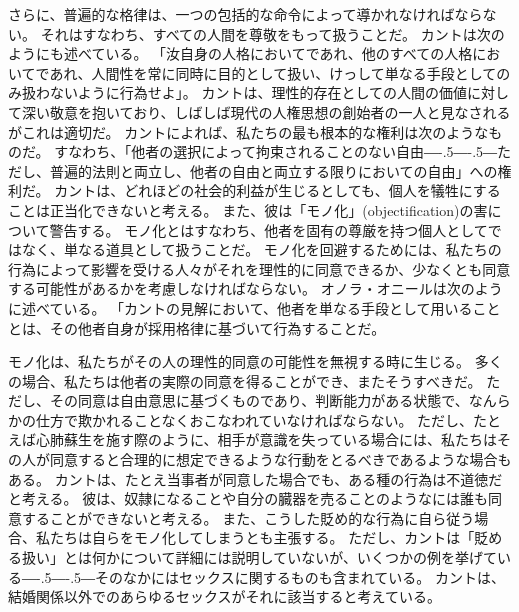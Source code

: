 \documentclass[paper=a4,book,openany]{jlreq}
\def\DDASH{―\kern-.5\zw―\kern-.5\zw―} %
\begin{document}
さらに、普遍的な格律は、一つの包括的な命令によって導かれなければならない。
それはすなわち、すべての人間を尊敬をもって扱うことだ。
カントは次のようにも述べている。
「汝自身の人格においてであれ、他のすべての人格においてであれ、人間性を常に同時に目的として扱い、けっして単なる手段としてのみ扱わないように行為せよ」\citep[4:429, p.41]{kant11:_groun_metap_moral}。
カントは、理性的存在としての人間の価値に対して深い敬意を抱いており、しばしば現代の人権思想の創始者の一人と見なされるがこれは適切だ。
カントによれば、私たちの最も根本的な権利は次のようなものだ。
すなわち、「他者の選択によって拘束されることのない自由{\DDASH}ただし、普遍的法則と両立し、他者の自由と両立する限りにおいての自由」\citep[6:237]{kant96:_metap_moral}への権利だ。
カントは、どれほどの社会的利益が生じるとしても、個人を犠牲にすることは正当化できないと考える。
また、彼は「モノ化」(objectification)の害について警告する。
モノ化とはすなわち、他者を固有の尊厳を持つ個人としてではなく、単なる道具として扱うことだ。
モノ化を回避するためには、私たちの行為によって影響を受ける人々がそれを理性的に同意できるか、少なくとも同意する可能性があるかを考慮しなければならない。
オノラ・オニールは次のように述べている。
「カントの見解において、他者を単なる手段として用いることとは、その他者自身が採用格律に基づいて行為することだ\citep[p.138]{oneill89:_const_reason}。

モノ化は、私たちがその人の理性的同意の可能性を無視する時に生じる。
多くの場合、私たちは他者の実際の同意を得ることができ、またそうすべきだ。
ただし、その同意は自由意思に基づくものであり、判断能力がある状態で、なんらかの仕方で欺かれることなくおこなわれていなければならない。
ただし、たとえば心肺蘇生を施す際のように、相手が意識を失っている場合には、私たちはその人が同意すると合理的に想定できるような行動をとるべきであるような場合もある。
カントは、たとえ当事者が同意した場合でも、ある種の行為は不道徳だと考える。
彼は、奴隷になることや自分の臓器を売ることのようなには誰も同意することができないと考える。
また、こうした貶め的な行為に自ら従う場合、私たちは自らをモノ化してしまうとも主張する。
ただし、カントは「貶める扱い」とは何かについて詳細には説明していないが、いくつかの例を挙げている{\DDASH}そのなかにはセックスに関するものも含まれている。
カントは、結婚関係以外でのあらゆるセックスがそれに該当すると考えている。
\end{document}
